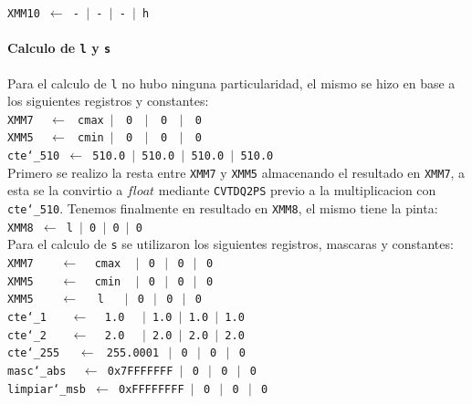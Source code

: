\noindent
\texttt{XMM10  $\gets$ - $\vert$ - $\vert$ - $\vert$ h}\\

\paragraph{Calculo de \texttt{l} y \texttt{s}\newline}

Para el calculo de \texttt{l} no hubo ninguna particularidad, el mismo se hizo en base a los siguientes registros y constantes:\\

\noindent
\texttt{XMM7 $\ \ \ \gets\ $ cmax $\vert\ \ $ 0 $\ \ \vert\ \ $ 0 $\ \ \vert\ \ $ 0}\\
\texttt{XMM5 $\ \ \ \gets\ $ cmin $\vert\ \ $ 0 $\ \ \vert\ \ $ 0 $\ \ \vert\ \ $ 0}\\
\texttt{cte\char`_510  $\gets$ 510.0 $\vert$ 510.0 $\vert$ 510.0 $\vert$ 510.0}\\

Primero se realizo la resta entre \texttt{XMM7} y \texttt{XMM5} almacenando el resultado en \texttt{XMM7}, a esta se la convirtio a $float$ mediante \texttt{CVTDQ2PS} previo a la multiplicacion con \texttt{cte\char`_510}. Tenemos finalmente en resultado en \texttt{XMM8}, el mismo tiene la pinta:\\

\noindent
\texttt{XMM8  $\gets$ l $\vert$ 0 $\vert$ 0 $\vert$ 0}\\

Para el calculo de \texttt{s} se utilizaron los siguientes registros, mascaras y constantes:\\

\noindent
\texttt{XMM7 $\ \ \ \ \ \ \ \gets\ \ \ $ cmax $\ \ \ \vert\ $ 0 $\ \vert\ $ 0 $\ \vert\ $ 0}\\
\texttt{XMM5 $\ \ \ \ \ \ \ \gets\ \ \ $ cmin $\ \ \ \vert\ $ 0 $\ \vert\ $ 0 $\ \vert\ $ 0}\\
\texttt{XMM5 $\ \ \ \ \ \ \ \gets\ \ \ \ $ l $\ \ \ \ \ \vert\ $ 0 $\ \vert\ $ 0 $\ \vert\ $ 0}\\
\texttt{cte\char`_1  $\ \ \ \ \ \ \gets\ \ \ $ 1.0 $\ \ \ \ \vert$ 1.0 $\vert$ 1.0 $\vert$ 1.0}\\
\texttt{cte\char`_2  $\ \ \ \ \ \ \gets\ \ \ $ 2.0 $\ \ \ \ \vert$ 2.0 $\vert$ 2.0 $\vert$ 2.0}\\
\texttt{cte\char`_255  $\ \ \ \ \gets\ $ 255.0001 $\ \vert\ $ 0 $\ \vert\ $ 0 $\ \vert\ $ 0}\\
\texttt{masc\char`_abs  $\ \ \ \gets$ 0x7FFFFFFF $\vert\ $ 0 $\ \vert\ $ 0 $\ \vert\ $ 0}\\
\texttt{limpiar\char`_msb  $\gets$ 0xFFFFFFFF $\vert\ $ 0 $\ \vert\ $ 0 $\ \vert\ $ 0}\\

